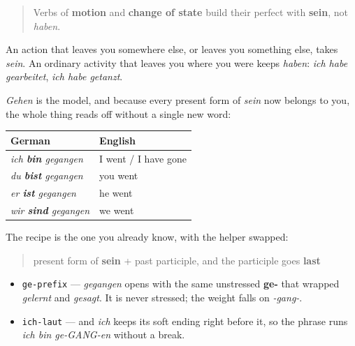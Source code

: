 \begin{grammarlens}[title={Grammar Lens: which verbs take sein}]
\begin{quote}
Verbs of \textbf{motion} and \textbf{change of state} build their perfect with \textbf{sein}, not \emph{haben}.
\end{quote}

An action that leaves you somewhere else, or leaves you something else, takes \emph{sein}. An ordinary activity that leaves you where you were keeps \emph{haben}: \emph{ich habe gearbeitet}, \emph{ich habe getanzt}.

\emph{Gehen} is the model, and because every present form of \emph{sein} now belongs to you, the whole thing reads off without a single new word:

\noindent
\begin{tabularx}{\linewidth}{@{}>{\raggedright\arraybackslash}X>{\raggedright\arraybackslash}X@{}}
\toprule
\textbf{German} & \textbf{English} \\
\midrule
\emph{ich \textbf{bin} gegangen} & I went / I have gone \\
\emph{du \textbf{bist} gegangen} & you went \\
\emph{er \textbf{ist} gegangen} & he went \\
\emph{wir \textbf{sind} gegangen} & we went \\
\bottomrule
\end{tabularx}

The recipe is the one you already know, with the helper swapped:

\begin{quote}
present form of \textbf{sein} + past participle, and the participle goes \textbf{last}
\end{quote}
\end{grammarlens}

\begin{sounds}
\begin{itemize}
\raggedright
  \item \texttt{ge-prefix} — \emph{gegangen} opens with the same unstressed \textbf{ge-} that wrapped \emph{gelernt} and \emph{gesagt}. It is never stressed; the weight falls on \emph{-gang-}.
  \item \texttt{ich-laut} — and \emph{ich} keeps its soft ending right before it, so the phrase runs \emph{ich bin ge-GANG-en} without a break.
\end{itemize}
\end{sounds}

